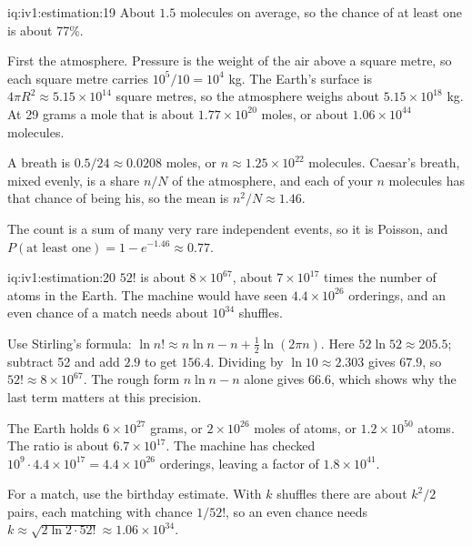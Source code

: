 \begin{solution}{iq:iv1:estimation:19}
About $1.5$ molecules on average, so the chance of at least one is about 77\%.

First the atmosphere. Pressure is the weight of the air above a square metre, so each square metre carries $10^5/10 = 10^4$ kg. The Earth's surface is $4\pi R^2 \approx 5.15 \times 10^{14}$ square metres, so the atmosphere weighs about $5.15 \times 10^{18}$ kg. At 29 grams a mole that is about $1.77 \times 10^{20}$ moles, or about $1.06 \times 10^{44}$ molecules.

A breath is $0.5/24 \approx 0.0208$ moles, or $n \approx 1.25 \times 10^{22}$ molecules. Caesar's breath, mixed evenly, is a share $n/N$ of the atmosphere, and each of your $n$ molecules has that chance of being his, so the mean is $n^2/N \approx 1.46$.

The count is a sum of many very rare independent events, so it is Poisson, and $P(\text{at least one}) = 1 - e^{-1.46} \approx 0.77$.

\end{solution}

\begin{solution}{iq:iv1:estimation:20}
$52!$ is about $8 \times 10^{67}$, about $7 \times 10^{17}$ times the number of atoms in the Earth. The machine would have seen $4.4 \times 10^{26}$ orderings, and an even chance of a match needs about $10^{34}$ shuffles.

Use Stirling's formula: $\ln n! \approx n \ln n - n + \tfrac12 \ln(2\pi n)$. Here $52 \ln 52 \approx 205.5$; subtract 52 and add $2.9$ to get $156.4$. Dividing by $\ln 10 \approx 2.303$ gives $67.9$, so $52! \approx 8 \times 10^{67}$. The rough form $n \ln n - n$ alone gives 66.6, which shows why the last term matters at this precision.

The Earth holds $6 \times 10^{27}$ grams, or $2 \times 10^{26}$ moles of atoms, or $1.2 \times 10^{50}$ atoms. The ratio is about $6.7 \times 10^{17}$. The machine has checked $10^9 \cdot 4.4 \times 10^{17} = 4.4 \times 10^{26}$ orderings, leaving a factor of $1.8 \times 10^{41}$.

For a match, use the birthday estimate. With $k$ shuffles there are about $k^2/2$ pairs, each matching with chance $1/52!$, so an even chance needs $k \approx \sqrt{2 \ln 2 \cdot 52!} \approx 1.06 \times 10^{34}$.

\end{solution}

